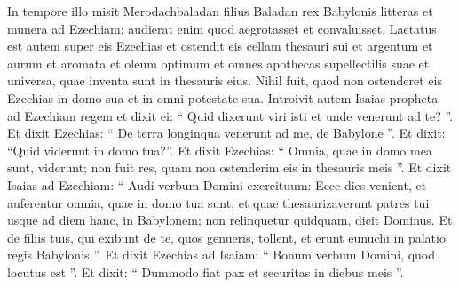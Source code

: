 \begin{biblechapter}
\begin{biblechapter}
\begin{biblechapter}
\begin{biblechapter}
\begin{biblechapter}
\begin{biblechapter}
\begin{biblechapter}
\begin{biblechapter}
\begin{biblechapter}
\begin{biblechapter}
\begin{biblechapter}
\begin{biblechapter}
\begin{biblechapter}
\begin{biblechapter}
\begin{biblechapter}
\begin{biblechapter}
\begin{biblechapter}
\begin{biblechapter}
\begin{biblechapter}
\begin{biblechapter}
\begin{biblechapter}
\begin{biblechapter}
\begin{biblechapter}
\begin{biblechapter}
\begin{biblechapter}
\begin{biblechapter}
\begin{biblechapter}
\begin{biblechapter}
\begin{biblechapter}
\begin{biblechapter}
\begin{biblechapter}
\begin{biblechapter}
\begin{biblechapter}
\begin{biblechapter}
\begin{biblechapter}
\begin{biblechapter}
\begin{biblechapter}
\begin{biblechapter}
\begin{biblechapter}
\verse In tempore illo misit Merodachbaladan filius Baladan rex Babylonis litteras et munera ad Ezechiam; audierat enim quod aegrotasset et convaluisset. 
\verse Laetatus est autem super eis Ezechias et ostendit eis cellam thesauri sui et argentum et aurum et aromata et oleum optimum et omnes apothecas supellectilis suae et universa, quae inventa sunt in thesauris eius. Nihil fuit, quod non ostenderet eis Ezechias in domo sua et in omni potestate sua.
 \verse Introivit autem Isaias propheta ad Ezechiam regem et dixit ei: “ Quid dixerunt viri isti et unde venerunt ad te? ”. Et dixit Ezechias: “ De terra longinqua venerunt ad me, de Babylone ”. 
\verse Et dixit: “Quid viderunt in domo tua?”. Et dixit Ezechias: “ Omnia, quae in domo mea sunt, viderunt; non fuit res, quam non ostenderim eis in thesauris meis ”.
 \verse Et dixit Isaias ad Ezechiam: “ Audi verbum Domini exercituum: 
\verse Ecce dies venient, et auferentur omnia, quae in domo tua sunt, et quae thesaurizaverunt patres tui usque ad diem hanc, in Babylonem; non relinquetur quidquam, dicit Dominus. 
\verse Et de filiis tuis, qui exibunt de te, quos genueris, tollent, et erunt eunuchi in palatio regis Babylonis ”. 
\verse Et dixit Ezechias ad Isaiam: “ Bonum verbum Domini, quod locutus est ”. Et dixit: “ Dummodo fiat pax et securitas in diebus meis ”.
 

\end{biblechapter}
\end{biblechapter}
\end{biblechapter}
\end{biblechapter}
\end{biblechapter}
\end{biblechapter}
\end{biblechapter}
\end{biblechapter}
\end{biblechapter}
\end{biblechapter}
\end{biblechapter}
\end{biblechapter}
\end{biblechapter}
\end{biblechapter}
\end{biblechapter}
\end{biblechapter}
\end{biblechapter}
\end{biblechapter}
\end{biblechapter}
\end{biblechapter}
\end{biblechapter}
\end{biblechapter}
\end{biblechapter}
\end{biblechapter}
\end{biblechapter}
\end{biblechapter}
\end{biblechapter}
\end{biblechapter}
\end{biblechapter}
\end{biblechapter}
\end{biblechapter}
\end{biblechapter}
\end{biblechapter}
\end{biblechapter}
\end{biblechapter}
\end{biblechapter}
\end{biblechapter}
\end{biblechapter}
\end{biblechapter}
